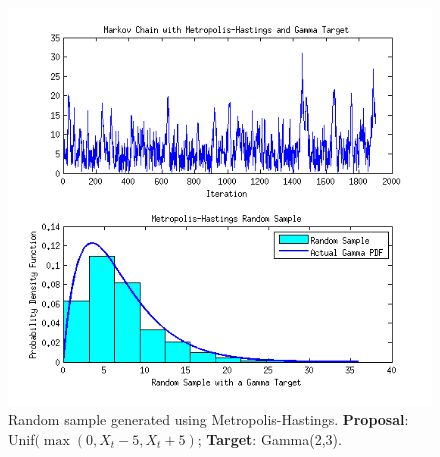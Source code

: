 \documentclass[12pt,a4paper]{article}
\begin{document}
\begin{figure}[ht!] 
\begin{center}
\includegraphics[scale=.95]{graph4.png}
\caption{Random sample generated using Metropolis-Hastings. \textbf{Proposal}: Unif$(\max(0, X_t-5,X_t+5)$;  \textbf{Target}: Gamma(2,3).}
\label{q3fig1}
\end{center}
\end{figure}
\FloatBarrier
\end{document}
